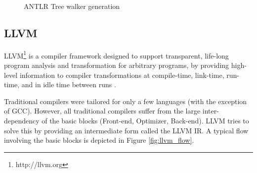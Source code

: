 \begin{figure}[hb!]
  \centering
  \caption{ANTLR Tree walker generation}
  \label{fig:antlr_tree_walker}
\end{figure}

\subsection{LLVM}

LLVM\footnote{http://llvm.org} is a compiler framework designed to
support transparent, life-long program analysis and transformation for
arbitrary programs, by providing high-level information to compiler
transformations at compile-time, link-time, run-time, and in idle time
between runs \cite{LLVM:CGO04}.

Traditional compilers were tailored for only a few languages (with the
exception of GCC). However, all traditional compilers suffer from the
large inter-dependency of the basic blocks (Front-end, Optimizer,
Back-end). LLVM tries to solve this by providing an intermediate form
called the LLVM IR. A typical flow involving the basic blocks is
depicted in Figure \ref{fig:llvm_flow}.

